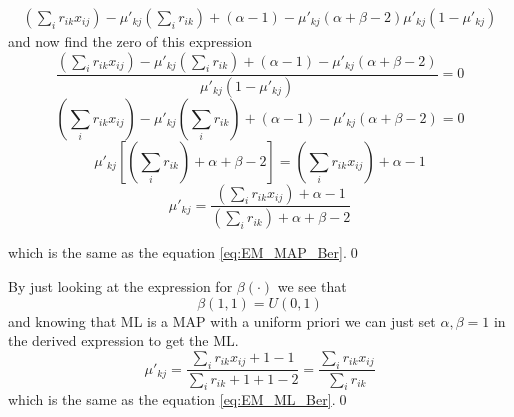 \documentclass[a4paper,twoside=false,abstract=false,numbers=noenddot,
titlepage=false,headings=small,parskip=half,version=last]{scrartcl}
\begin{document}
\begin{solution}
\begin{eqnarray}
        {
            \left(\sum_i r_{ik}x_{ij}\right) - 
            \mu'_{kj}\left(\sum_i r_{ik}\right) +
            (\alpha-1)-\mu'_{kj}(\alpha+\beta-2)
        }
        {
            \mu'_{kj}(1-\mu'_{kj}) 
        }
    \end{eqnarray}
    and now find the zero of this expression
    \begin{equation}
       \frac
        {
            \left(\sum_i r_{ik}x_{ij}\right) - 
            \mu'_{kj}\left(\sum_i r_{ik}\right) +
            (\alpha-1)-\mu'_{kj}(\alpha+\beta-2)
        }
        {
            \mu'_{kj}(1-\mu'_{kj}) 
        } = 0
    \end{equation}
    \begin{equation}
        \left(\textstyle\sum_i r_{ik}x_{ij}\right) - 
        \mu'_{kj}\left(\textstyle\sum_i r_{ik}\right) +
        (\alpha-1)-\mu'_{kj}(\alpha+\beta-2)
         = 0
    \end{equation}
    \begin{equation}
        \mu'_{kj} \left[\left(\textstyle\sum_i r_{ik}\right)+\alpha+\beta-2\right] 
        = \left(\textstyle\sum_i r_{ik} x_{ij}\right)+\alpha-1
    \end{equation}
    \begin{equation}
        \mu'_{kj} = \frac{
            \left(\sum_i r_{ik} x_{ij}\right)+\alpha-1
        }
        {
            \left(\sum_i r_{ik}\right)+\alpha+\beta-2
        }
    \end{equation}

    which is the same as the equation \eqref{eq:EM_MAP_Ber}.\qed
   
    By just looking at the expression for $\beta(\cdot)$ we see that
    \begin{equation}
        \beta(1,1) = U(0,1) 
    \end{equation}
    and knowing that ML is a MAP with a uniform priori we can just set
    $\alpha,\beta=1$ in the derived expression to get the ML.
    \begin{equation}
        \mu'_{kj} =
        \frac{\sum_ir_{ik}x_{ij}+1-1}{\sum_ir_{ik}+1+1-2} =
        \frac{\sum_ir_{ik}x_{ij}}{\sum_ir_{ik}}
    \end{equation}
    which is the same as the equation \eqref{eq:EM_ML_Ber}.\qed

\end{solution}

\end{document}
